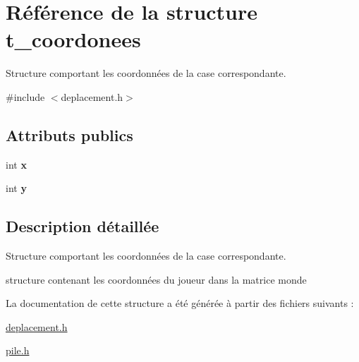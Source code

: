 \hypertarget{structt__coordonees}{\section{Référence de la structure t\-\_\-coordonees}
\label{structt__coordonees}
}


Structure comportant les coordonnées de la case correspondante.  




{\ttfamily \#include $<$deplacement.\-h$>$}

\subsection*{Attributs publics}
\begin{DoxyCompactItemize}
\item 
\hypertarget{structt__coordonees_af50513442c4cb756f5b15d4c23dc47c9}{int {\bfseries x}}\label{structt__coordonees_af50513442c4cb756f5b15d4c23dc47c9}

\item 
\hypertarget{structt__coordonees_a5d637c9bbed637ce50c9b5613a4ec1e2}{int {\bfseries y}}\label{structt__coordonees_a5d637c9bbed637ce50c9b5613a4ec1e2}

\end{DoxyCompactItemize}


\subsection{Description détaillée}
Structure comportant les coordonnées de la case correspondante. 

structure contenant les coordonnées du joueur dans la matrice monde 

La documentation de cette structure a été générée à partir des fichiers suivants \-:\begin{DoxyCompactItemize}
\item 
\hyperlink{deplacement_8h}{deplacement.\-h}\item 
\hyperlink{pile_8h}{pile.\-h}\end{DoxyCompactItemize}
